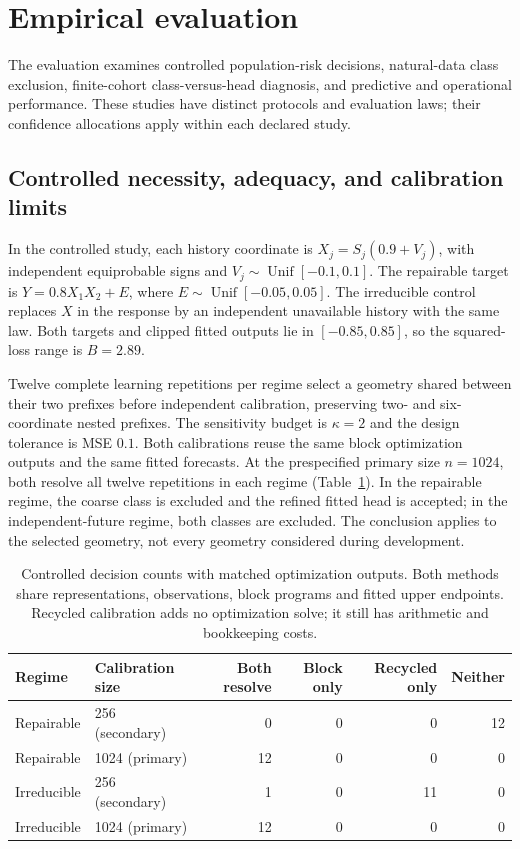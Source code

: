 \section{Empirical evaluation}
\label{sec:evidence}
The evaluation examines controlled population-risk decisions, natural-data class exclusion, finite-cohort class-versus-head diagnosis, and predictive and operational performance. These studies have distinct protocols and evaluation laws; their confidence allocations apply within each declared study.

\subsection{Controlled necessity, adequacy, and calibration limits}
In the controlled study, each history coordinate is
$X_j=S_j(0.9+V_j)$, with independent equiprobable signs and
$V_j\sim\operatorname{Unif}[-0.1,0.1]$.
The repairable target is $Y=0.8X_1X_2+E$, where
$E\sim\operatorname{Unif}[-0.05,0.05]$.
The irreducible control replaces $X$ in the response by an independent unavailable history with the same law.
Both targets and clipped fitted outputs lie in $[-0.85,0.85]$, so the squared-loss range is $B=2.89$.

Twelve complete learning repetitions per regime select a geometry shared between their two prefixes before independent calibration, preserving two- and six-coordinate nested prefixes. The sensitivity budget is $\kappa=2$ and the design tolerance is MSE $0.1$. Both calibrations reuse the same block optimization outputs and the same fitted forecasts. At the prespecified primary size $n=1024$, both resolve all twelve repetitions in each regime (Table~\ref{tab:controlled}). In the repairable regime, the coarse class is excluded and the refined fitted head is accepted; in the independent-future regime, both classes are excluded. The conclusion applies to the selected geometry, not every geometry considered during development.

\begin{table}[htbp]
\centering\small
\begin{tabular}{@{}llrrrr@{}}
\toprule
Regime & Calibration size & Both resolve & Block only & Recycled only & Neither\\
\midrule
Repairable & 256 (secondary) & 0 & 0 & 0 & 12\\
Repairable & 1024 (primary) & 12 & 0 & 0 & 0\\
Irreducible & 256 (secondary) & 1 & 0 & 11 & 0\\
Irreducible & 1024 (primary) & 12 & 0 & 0 & 0\\
\bottomrule
\end{tabular}
\caption{Controlled decision counts with matched optimization outputs. Both methods share representations, observations, block programs and fitted upper endpoints. Recycled calibration adds no optimization solve; it still has arithmetic and bookkeeping costs.}
\label{tab:controlled}
\end{table}

